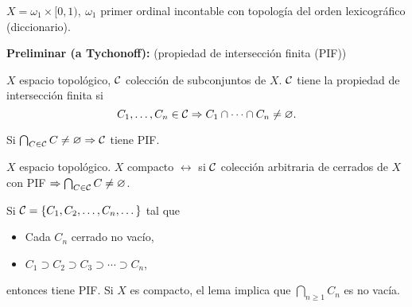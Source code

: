 \begin{eg}
	$X = \omega_{1} \times [0,1),\ \omega_{1}$ primer ordinal incontable con topología del orden lexicográfico (diccionario).
\end{eg}

\noindent \textbf{Preliminar (a Tychonoff):} (propiedad de intersección finita (PIF))

\begin{definition}[PIF]
	$X$ espacio topológico, $\mathcal{C}$ colección de subconjuntos de $X$. $\mathcal{C}$ tiene la propiedad de intersección finita si
	\[ C_{1},\dots,C_{n} \in \mathcal{C} \Rightarrow C_{1} \cap \cdots \cap C_{n} \neq \varnothing. \]
\end{definition}

\begin{eg}
	Si $\bigcap_{C \in \mathcal{C}} C \neq \varnothing \Rightarrow \mathcal{C}$ tiene PIF.
\end{eg}

\begin{lemma}
	$X$ espacio topológico. $X$ compacto $\leftrightarrow$ si $\mathcal{C}$ colección arbitraria de cerrados de $X$ con PIF $\Rightarrow \bigcap_{C \in \mathcal{C}} C \neq \varnothing$.
\end{lemma}

\begin{eg}
	Si $\mathcal{C} = \{C_{1},C_{2},\dots,C_{n},\dots\}$ tal que
	\begin{itemize}
		\item Cada $C_{n}$ cerrado no vacío,

		\item $C_{1} \supset C_{2} \supset C_{3} \supset \cdots \supset C_{n}$,
	\end{itemize}
	entonces tiene PIF. Si $X$ es compacto, el lema implica que $\bigcap_{n \geq 1} C_{n}$ es no vacía.
\end{eg}
